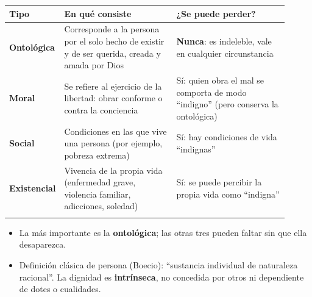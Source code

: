 \documentclass[10pt,a4paper]{article}
\begin{document}
{\small\renewcommand{\arraystretch}{1.25}
\begin{longtable}{>{\raggedright\arraybackslash}p{0.074\linewidth}>{\raggedright\arraybackslash}p{0.418\linewidth}>{\raggedright\arraybackslash}p{0.418\linewidth}}
\toprule
\textbf{Tipo} & \textbf{En qué consiste} & \textbf{¿Se puede perder?} \\ \midrule \endhead
\textbf{Ontológica} & Corresponde a la persona por el solo hecho de existir y de ser querida, creada y amada por Dios & \textbf{Nunca}: es indeleble, vale en cualquier circunstancia \\ \addlinespace[2pt]
\textbf{Moral} & Se refiere al ejercicio de la libertad: obrar conforme o contra la conciencia & Sí: quien obra el mal se comporta de modo ``indigno'' (pero conserva la ontológica) \\ \addlinespace[2pt]
\textbf{Social} & Condiciones en las que vive una persona (por ejemplo, pobreza extrema) & Sí: hay condiciones de vida ``indignas'' \\ \addlinespace[2pt]
\textbf{Existencial} & Vivencia de la propia vida (enfermedad grave, violencia familiar, adicciones, soledad) & Sí: se puede percibir la propia vida como ``indigna'' \\ \addlinespace[2pt]
\bottomrule\end{longtable}}

\begin{itemize}
\item La más importante es la \textbf{ontológica}; las otras tres pueden faltar sin que ella desaparezca.
\item Definición clásica de persona (Boecio): ``sustancia individual de naturaleza racional''. La dignidad es \textbf{intrínseca}, no concedida por otros ni dependiente de dotes o cualidades.
\end{itemize}
\end{document}
